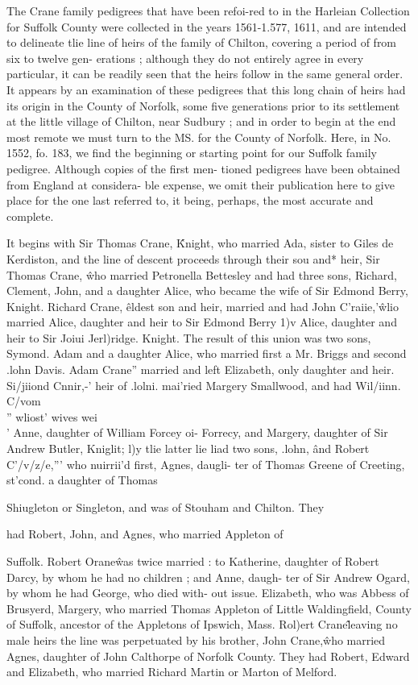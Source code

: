 The Crane family pedigrees that have been refoi-red to in the 
Harleian Collection for Suffolk County were collected in the years 
1561-1.577, 1611, and are intended to delineate tlie line of heirs of 
the family of Chilton, covering a period of from six to twelve gen- 
erations ; although they do not entirely agree in every particular, 
it can be readily seen that the heirs follow in the same general 
order. It appears by an examination of these pedigrees that this 
long chain of heirs had its origin in the County of Norfolk, some 
five generations prior to its settlement at the little village of 
Chilton, near Sudbury ; and in order to begin at the end most 
remote we must turn to the MS. for the County of Norfolk. 
Here, in No. 1552, fo. 183, we find the beginning or starting point 
for our Suffolk family pedigree. Although copies of the first men- 
tioned pedigrees have been obtained from England at considera- 
ble expense, we omit their publication here to give place for the 
one last referred to, it being, perhaps, the most accurate and 
complete. 

It begins with Sir Thomas Crane, \^ Knight, who married Ada, 
sister to Giles de Kerdiston, and the line of descent proceeds 
through their sou and* heir, Sir Thomas Crane, \^ who married 
Petronella Bettesley and had three sons, Richard, Clement, John, 
and a daughter Alice, who became the wife of Sir Edmond Berry, 
Knight. Richard Crane, \^ eldest son and heir, married and had 
John C'raiie,'\^ wlio married Alice, daughter and heir to Sir 
Edmond Berry 1)v Alice, daughter and heir to Sir Joiui Jerl)ridge. 
Knight. The result of this union was two sons, Symond. Adam 
and a daughter Alice, who married first a Mr. Briggs and second 
.lohn Davis. Adam Crane'' married and left Elizabeth, only 
daughter and heir. Si/jiiond Cnnir,-' heir of .lolni. mai'ried 
Margery Smallwood, and had Wil/iinn. C/vom\\'' wliost' wives wei\\' 
Anne, daughter of William Forcey oi- Forrecy, and Margery, 
daughter of Sir Andrew Butler, Kniglit; l)y tlie latter lie liad two 
sons, .lohn, \^ and Robert C'/v/z/e,''' who nuirrii'd first, Agnes, daugli- 
ter of Thomas Greene of Creeting, st'cond. a daughter of Thomas 




Shiugleton or Singleton, and was of Stouham and Chilton. They 

had Robert, John, and Agnes, who married Appleton of 

Suffolk. Robert Orane\^ was twice married : to Katherine, daughter 
of Robert Darcy, by whom he had no children ; and Anne, daugh- 
ter of Sir Andrew Ogard, by whom he had George, who died with- 
out issue. Elizabeth, who was Abbess of Brusyerd, Margery, 
who married Thomas Appleton of Little Waldingfield, County of 
Suffolk, ancestor of the Appletons of Ipswich, Mass. Rol)ert 
Crane\^ leaving no male heirs the line was perpetuated by his 
brother, John Crane,\^ who married Agnes, daughter of John 
Calthorpe of Norfolk County. They had Robert, Edward and 
Elizabeth, who married Richard Martin or Marton of Melford. 


